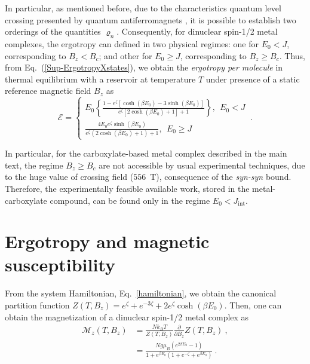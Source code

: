 \documentclass[aps,prl,epsfigure,twocolumn,superscriptaddress]{revtex4-1}
\newcommand{\Ecal}{\mathcal{E}}
\newcommand{\Mcal}{\mathcal{M}}
\newcommand{\1}{\mathbbm{1}}
\begin{document}
In particular, as mentioned before, due to the characteristics quantum level crossing presented by quantum antiferromagnets \cite{chakraborty2019magnetocaloric,cruz2020quantifying,breunig2017quantum}, it is  possible to establish two orderings of the quantities $\varrho_{n}$. Consequently, for dinuclear spin-1/2 metal complexes, the ergotropy can defined in two physical regimes: one for $E_{0}\!<\! J$, corresponding to $B_{z}<B_{c}$; and other for $E_{0}\!\geq\! J$, corresponding to $B_{z}\geq B_{c}$. Thus, from Eq.~(\ref{Sup-ErgotropyXstates}), we obtain the \textit{ergotropy per molecule} in thermal equilibrium with a reservoir at temperature $T$ under presence of a static reference magnetic field $B_{z}$ as
\begin{equation}
\Ecal= \left\{
\begin{aligned}
E_{0} \left\{\frac{1 - e^{{\zeta}}\left[\cosh \left(\beta E_{0}\right)-3 \sinh \left(\beta E_{0}\right)\right]}{e^{{\zeta}}\left[2 \cosh \left(\beta E_{0}\right)+1\right]+1}\right\}, ~~ E_{0}< {J} \\
\frac{4 E_{0}e^{{\zeta}}\sinh \left(\beta E_{0}\right)}{e^{{\zeta}}\left(2 \cosh \left(\beta E_{0}\right)+1\right)+1}, ~~ E_{0}\geq {J}
\end{aligned}
\right.~.
\label{Sup-ErgotropyCarboxylate}
\end{equation}

In particular, for the carboxylate-based metal complex described in the main text, the regime $B_{z}\geq B_{c}$ are not accessible by usual experimental techniques, due to the huge value of crossing field ($556$~T), consequence of the \textit{syn-syn} bound. Therefore, the experimentally  feasible available work, stored in the metal-carboxylate compound, can be found only in the regime $E_{0}\!<\! J_{\text{int}}$.

\section{Ergotropy and magnetic susceptibility}

From the system Hamiltonian, Eq.~\eqref{hamiltonian}, we obtain the canonical partition function $Z(T,B_z)\!=\!e^{{\zeta}} + e^{-3{\zeta}} + 2 e^{{\zeta}} \cosh\left(\beta E_{0}\right)$. Then, one can obtain the magnetization of a dinuclear spin-1/2 metal complex as~\cite{mario}
\begin{align}
\Mcal_z(T,B_z) &=  \frac{Nk_{B}T}{Z (T,B_z)}\frac{\partial}{\partial B_z} Z(T,B_z)~, \nonumber \\
&= \frac{Ng\mu_B\left( e^{2\beta E_0} - 1\right)}{ 1 +  e^{\beta E_0} \left( 1+ e^{-\zeta} + e^{\beta E_0}\right)}~.
\label{magnetization}
\end{align}
\end{document}
